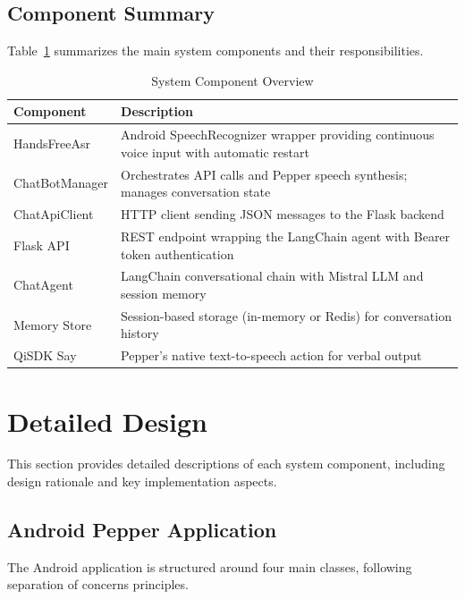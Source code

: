\documentclass[a4paper]{article}
\begin{document}
\subsection{Component Summary}

Table~\ref{tab:components} summarizes the main system components and their responsibilities.

\begin{table}[htbp]
    \centering
    \caption{System Component Overview}
    \label{tab:components}
    \begin{tabular}{@{}lp{9cm}@{}}
        \toprule
        \textbf{Component} & \textbf{Description} \\
        \midrule
        HandsFreeAsr & Android SpeechRecognizer wrapper providing continuous voice input with automatic restart \\
        ChatBotManager & Orchestrates API calls and Pepper speech synthesis; manages conversation state \\
        ChatApiClient & HTTP client sending JSON messages to the Flask backend \\
        Flask API & REST endpoint wrapping the LangChain agent with Bearer token authentication \\
        ChatAgent & LangChain conversational chain with Mistral LLM and session memory \\
        Memory Store & Session-based storage (in-memory or Redis) for conversation history \\
        QiSDK Say & Pepper's native text-to-speech action for verbal output \\
        \bottomrule
    \end{tabular}
\end{table}

\section{Detailed Design}
\label{sec:detailed-design}

This section provides detailed descriptions of each system component, including design rationale and key implementation aspects.

\subsection{Android Pepper Application}
\label{subsec:android-app}

The Android application is structured around four main classes, following separation of concerns principles.
\end{document}

